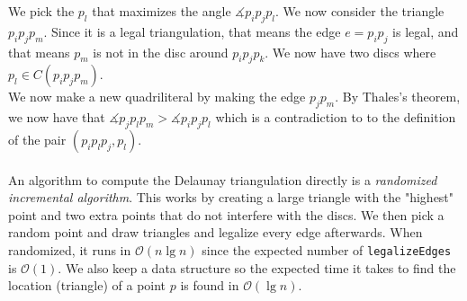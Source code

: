 \documentclass[a4paper]{article}
\begin{document}
We pick the $p_l$ that maximizes the angle $\measuredangle p_ip_jp_l$. We now consider the triangle $p_ip_jp_m$. Since it is a legal triangulation, that means the edge $e=p_ip_j$ is legal, and that means $p_m$ is not in the disc around $p_ip_jp_k$. We now have two discs where $p_l\in C(p_ip_jp_m)$. \\
We now make a new quadriliteral by making the edge $p_jp_m$. By Thales's theorem, we now have that $\measuredangle p_jp_lp_m > \measuredangle p_ip_jp_l$ which is a contradiction to to the definition of the pair $(p_ip_lp_j,p_l)$. \\
\\
An algorithm to compute the Delaunay triangulation directly is a \textit{randomized incremental algorithm}. This works by creating a large triangle with the "highest" point and two extra points that do not interfere with the discs. We then pick a random point and draw triangles and legalize every edge afterwards. When randomized, it runs in $\mathcal{O}(n\lg n)$ since the expected number of \texttt{legalizeEdges} is $\mathcal{O}(1)$. We also keep a data structure so the expected time it takes to find the location (triangle) of a point $p$ is found in $\mathcal{O}(\lg n)$. 
\end{document}
